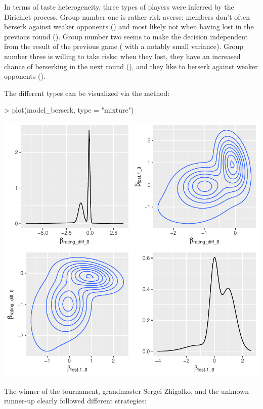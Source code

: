 \documentclass[article,shortnames]{jss}
\newcommand{\fct}[1]{\code{#1()}}
\begin{document}
In terms of taste heterogeneity, three types of players were inferred by the Dirichlet process. Group number one is rather risk averse: members don't often berserk against weaker opponents () and most likely not when having lost in the previous round (). Group number two seems to make the decision independent from the result of the previous game ( with a notably small variance). Group number three is willing to take risks: when they lost, they have an increased chance of berserking in the next round (), and they like to berserk against weaker opponents ().

The different types can be visualized via the \fct{plot} method:

\begin{Schunk}
\begin{Sinput}
> plot(model_berserk, type = "mixture")
\end{Sinput}
\end{Schunk}
\includegraphics{rprobitb_oelschlaeger_bauer-model-berserk-mixture}

The winner of the tournament, grandmaster Sergei Zhigalko, and the unknown runner-up clearly followed different strategies:
\end{document}
